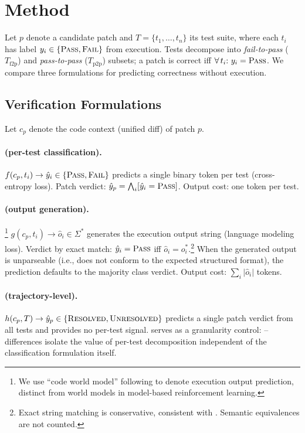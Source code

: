 \section{Method}
\label{sec:method}

Let $p$ denote a candidate patch and $T = \{t_1, \ldots, t_n\}$ its test suite, where each $t_i$ has label $y_i \in \{\text{\textsc{Pass}}, \text{\textsc{Fail}}\}$ from execution. Tests decompose into \emph{fail-to-pass} ($T_{\text{f2p}}$) and \emph{pass-to-pass} ($T_{\text{p2p}}$) subsets; a patch is correct iff $\forall\, t_i{:}\ y_i = \text{\textsc{Pass}}$. We compare three formulations for predicting correctness without execution.

\subsection{Verification Formulations}
\label{sec:formulations}

Let $c_p$ denote the code context (unified diff) of patch $p$.

\paragraph{\cls{} (per-test classification).} $f(c_p, t_i) \rightarrow \hat{y}_i \in \{\text{\textsc{Pass}}, \text{\textsc{Fail}}\}$ predicts a single binary token per test (cross-entropy loss). Patch verdict: $\hat{y}_p = \bigwedge_{i} [\hat{y}_i = \text{\textsc{Pass}}]$. Output cost: one token per test.

\paragraph{\cwm{} (output generation).}\footnote{We use ``code world model'' following \citet{meta2025cwm} to denote execution output prediction, distinct from world models in model-based reinforcement learning.} $g(c_p, t_i) \rightarrow \hat{o}_i \in \Sigma^*$ generates the execution output string (language modeling loss). Verdict by exact match: $\hat{y}_i = \text{\textsc{Pass}}$ iff $\hat{o}_i = o_i^*$.\footnote{Exact string matching is conservative, consistent with \citet{meta2025cwm}. Semantic equivalences are not counted.} When the generated output is unparseable (i.e., does not conform to the expected structured format), the prediction defaults to the majority class verdict. Output cost: $\sum_i |\hat{o}_i|$ tokens.

\paragraph{\traj{} (trajectory-level).} $h(c_p, T) \rightarrow \hat{y}_p \in \{\text{\textsc{Resolved}}, \text{\textsc{Unresolved}}\}$ predicts a single patch verdict from all tests and provides no per-test signal. \traj{} serves as a granularity control: \cls{}--\traj{} differences isolate the value of per-test decomposition independent of the classification formulation itself.

